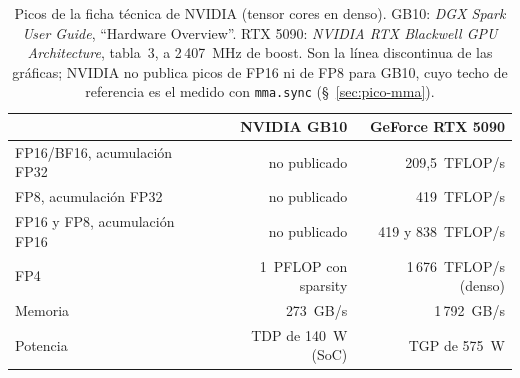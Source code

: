 \begin{table}[htbp]
  \centering\small
  \begin{tabularx}{\linewidth}{>{\raggedright\arraybackslash}X rr}
    \toprule
     & \textbf{NVIDIA GB10} & \textbf{GeForce RTX 5090} \\
    \midrule
    FP16/BF16, acumulación FP32 & no publicado & 209{,}5~TFLOP/s \\
    FP8, acumulación FP32 & no publicado & 419~TFLOP/s \\
    FP16 y FP8, acumulación FP16 & no publicado & 419 y 838~TFLOP/s \\
    FP4 & 1~PFLOP con sparsity & 1\,676~TFLOP/s (denso) \\
    Memoria & 273~GB/s & 1\,792~GB/s \\
    Potencia & TDP de 140~W (SoC) & TGP de 575~W \\
    \bottomrule
  \end{tabularx}
  \caption{Picos de la ficha técnica de NVIDIA (tensor cores en denso). GB10: \emph{DGX Spark
  User Guide}, ``Hardware Overview''. RTX 5090: \emph{NVIDIA RTX Blackwell GPU Architecture},
  tabla~3, a 2\,407~MHz de boost. Son la línea discontinua de las gráficas; NVIDIA no publica
  picos de FP16 ni de FP8 para GB10, cuyo techo de referencia es el medido con
  \texttt{mma.sync} (§~\ref{sec:pico-mma}).}
  \label{tab:fichas}
\end{table}
